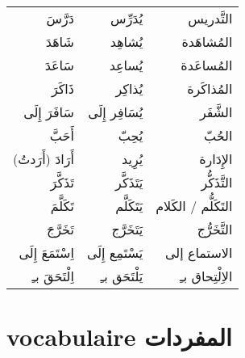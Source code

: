 \documentclass[a4paper]{article}
\begin{document}
\begin{tabular}{rrr}
دَرَّسَ               &       يُدَرِّس             &                التَّدريس \\
شَاهَدَ              &        يُشاهِد           &                  المُشاهَدة \\
سَاعَدَ              &        يُساعِد           &                  المُساعَدة \\
ذَاكَرَ              &         يُذاكِر          &                    المُذاكَرة \\
سَافَرَ إِلَى          &        يُسَافِر إِلَى       &                   الشَّفَر \\
أَحَبَّ               &        يُحِبّ             &                  الحُبّ \\
أَرَادَ (أَرَدتُ)       &       يُرِيد             &                   الإِدَارة \\
تَذَكَّرَ              &         يَتَذَكَّر          &                    التَّذَكُّر \\
تَكَلَّمَ              &           يَتَكَلَّم        &                      التَكَلُّم / الكَلام \\
تَخَرَّجَ              &         يَتَخَرَّج           &                 التَّخَرُّج \\
اِسْتَمَعَ إِلَى         &         يَسْتَمِع إِلَى       &                  الاستماع إلى \\
اِلْتَحَقَ بـِ          &          يَلْتَحَق بـِ       &                    الاِلْتِحاق بـِ \\
  \hline\hline
\end{tabular}





\section{\textenglish{vocabulaire} المفردات}
\end{document}
